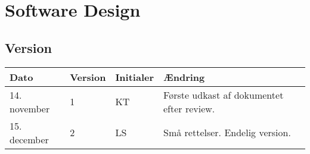 \chapter{Software Design}

\section{Version}
\begin{table}[h]
	\centering
	\begin{tabularx}{\textwidth - 2cm}{|l|l| l|X|}
	\hline
	Dato	& Version	& Initialer & Ændring	\\ \hline
	14. november & 1 & KT	& Første udkast af dokumentet efter review. \\ \hline
	15. december & 2 & LS & Små rettelser. Endelig version. \\ \hline
	\end{tabularx}
\end{table}






